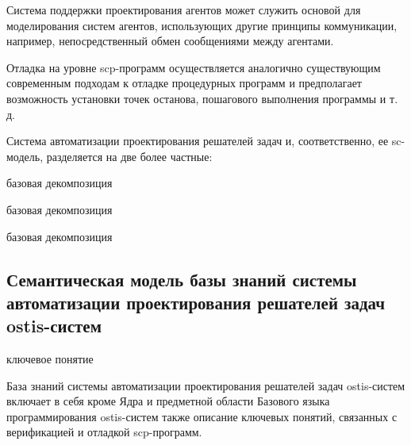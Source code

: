 Система поддержки проектирования агентов может служить основой для моделирования систем агентов, использующих другие принципы коммуникации, например, непосредственный обмен сообщениями между агентами.

Отладка на уровне scp-программ осуществляется аналогично существующим современным подходам к отладке процедурных программ и предполагает возможность установки точек останова, пошагового выполнения программы и т. д.

Система автоматизации проектирования решателей задач и, соответственно, ее sc-модель, разделяется на две более частные:

\begin{SCn}
\begin{scnreltoset}{базовая декомпозиция}
\begin{scnindent}
    \begin{scnreltoset}{базовая декомпозиция}
    \end{scnreltoset}
\end{scnindent}
\begin{scnindent}
    \begin{scnreltoset}{базовая декомпозиция}
    \end{scnreltoset}
\end{scnindent}
\end{scnreltoset}
\end{SCn}

\subsection{Семантическая модель базы знаний системы автоматизации проектирования решателей задач ostis-систем}
\begin{SCn}
\bigskip

\begin{scnrelfromlist}{ключевое понятие}
\end{scnrelfromlist}
\end{SCn}
\label{sub_sec_kb_ps_des_auto_sys}
База знаний системы автоматизации проектирования решателей задач ostis-систем включает в себя кроме Ядра и предметной области Базового языка программирования ostis-систем также описание ключевых понятий, связанных с верификацией и отладкой scp-программ.

